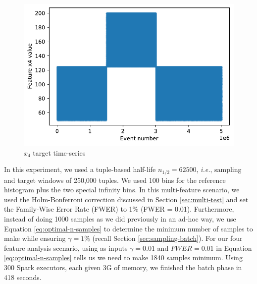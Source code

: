 \documentclass[sigconf]{acmart}
\begin{document}
\begin{figure}[!htb]
    \begin{center}
      \includegraphics[scale=0.5]{figures/timeseries-t6-x4.pdf} 
      \caption{$x_4$ target time-series} 
      \label{fig:timeseries-t6-x4} 
    \end{center}
\end{figure}

In this experiment, we used a tuple-based half-life $n_{1/2}=62500$, \textit{i.e.}, sampling and target windows of 250,000 tuples. We used 100 bins for the reference histogram plus the two special infinity bins. In this multi-feature scenario, we used the Holm-Bonferroni correction discussed in Section \ref{sec:multi-test} and set the Family-Wise Error Rate (FWER) to 1\% (FWER = 0.01). Furthermore, instead of doing 1000 samples as we did previously in an ad-hoc way, we use Equation \ref{eq:optimal-n-samples} to determine the minimum number of samples to make while ensuring $\gamma=1\%$ (recall Section \ref{sec:sampling-batch}). For our four feature analysis scenario, using as inputs  $\gamma=0.01$ and $FWER=0.01$ in Equation \ref{eq:optimal-n-samples} tells us we need to make 1840 samples minimum. Using 300 Spark executors, each given 3G of memory, we finished the batch phase in 418 seconds.
\end{document}
